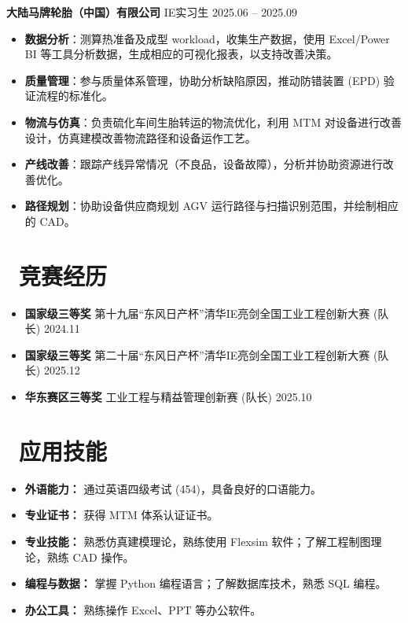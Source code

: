 \documentclass[11pt]{article}
\newlength{\intraProjectTitleSep}
\newcommand{\titlebreak}{\\[\intraProjectTitleSep]}
\newlength{\intraProjectListTopSep}
\begin{document}
\textbf{大陆马牌轮胎（中国）有限公司} \quad IE实习生 \hfill 2025.06 -- 2025.09 \titlebreak
\begin{itemize}[nosep, topsep=\intraProjectListTopSep]
    \item \textbf{数据分析}：测算热准备及成型 workload，收集生产数据，使用 Excel/Power BI 等工具分析数据，生成相应的可视化报表，以支持改善决策。
    \item \textbf{质量管理}：参与质量体系管理，协助分析缺陷原因，推动防错装置 (EPD) 验证流程的标准化。
    \item \textbf{物流与仿真}：负责硫化车间生胎转运的物流优化，利用 MTM 对设备进行改善设计，仿真建模改善物流路径和设备运作工艺。
    \item \textbf{产线改善}：跟踪产线异常情况（不良品，设备故障），分析并协助资源进行改善优化。
    \item \textbf{路径规划}：协助设备供应商规划 AGV 运行路径与扫描识别范围，并绘制相应的 CAD。
\end{itemize}

\section{\makebox[\widthof{\faTrophy}][c]{\color{CVBlue}\faTrophy}\ 竞赛经历}
\begin{itemize}[nosep, parsep=0.5ex]
    \item \textbf{国家级三等奖} \quad 第十九届“东风日产杯”清华IE亮剑全国工业工程创新大赛 (队长) \hfill 2024.11
    \item \textbf{国家级三等奖} \quad 第二十届“东风日产杯”清华IE亮剑全国工业工程创新大赛 (队长) \hfill 2025.12
    \item \textbf{华东赛区三等奖} \quad 工业工程与精益管理创新赛 (队长) \hfill 2025.10
\end{itemize}

\section{\makebox[\widthof{\faCogs}][c]{\color{CVBlue}\faCogs}\ 应用技能}
\begin{itemize}[nosep, parsep=0.5ex]
    \item \textbf{外语能力：} 通过英语四级考试 (454)，具备良好的口语能力。
    \item \textbf{专业证书：} 获得 MTM 体系认证证书。
    \item \textbf{专业技能：} 熟悉仿真建模理论，熟练使用 Flexsim 软件；了解工程制图理论，熟练 CAD 操作。
    \item \textbf{编程与数据：} 掌握 Python 编程语言；了解数据库技术，熟悉 SQL 编程。
    \item \textbf{办公工具：} 熟练操作 Excel、PPT 等办公软件。
\end{itemize}
\end{document}
